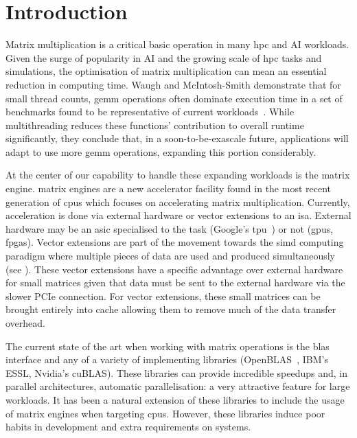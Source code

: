\documentclass[\main/thesis.tex]{subfiles}
\begin{document}
\chapter{Introduction}
\label{cha:intro}

Matrix multiplication is a critical basic operation in many \gls{hpc} and AI workloads.
Given the surge of popularity in AI and the growing scale of \gls{hpc} tasks and simulations, the optimisation of matrix multiplication can mean an essential reduction in computing time.
Waugh and McIntosh-Smith demonstrate that for small thread counts, \gls{gemm} operations often dominate execution time in a set of benchmarks found to be representative of current workloads~\autocite{waugh2020use}.
While multithreading reduces these functions' contribution to overall runtime significantly, they conclude that, in a soon-to-be-exascale future, applications will adapt to use more \gls{gemm} operations, expanding this portion considerably.

At the center of our capability to handle these expanding workloads is the \gls{matrix engine}.
\Glspl{matrix engine} are a new accelerator facility found in the most recent generation of \glspl{cpu} which focuses on accelerating matrix multiplication.
Currently, acceleration is done via external hardware or vector extensions to an \gls{isa}.
External hardware may be an \gls{asic} specialised to the task (\eg Google's \gls{tpu}~\autocite{abadi2016tensorflow}) or not (\eg \glspl{gpu}, \glspl{fpga}).
Vector extensions are part of the movement towards the \gls{simd} computing paradigm where multiple pieces of data are used and produced simultaneously (see ).
These vector extensions have a specific advantage over external hardware for small matrices given that data must be sent to the external hardware via the slower PCIe connection.
For vector extensions, these small matrices can be brought entirely into cache allowing them to remove much of the data transfer overhead.

The current state of the art when working with matrix operations is the \gls{blas} interface and any of a variety of implementing libraries (\eg OpenBLAS~\autocite{2012xianyi}, IBM's ESSL, Nvidia's cuBLAS).
These libraries can provide incredible speedups and, in parallel architectures, automatic parallelisation: a very attractive feature for large workloads.
It has been a natural extension of these libraries to include the usage of matrix engines when targeting \glspl{cpu}.
However, these libraries induce poor habits in development and extra requirements on systems.
\end{document}
